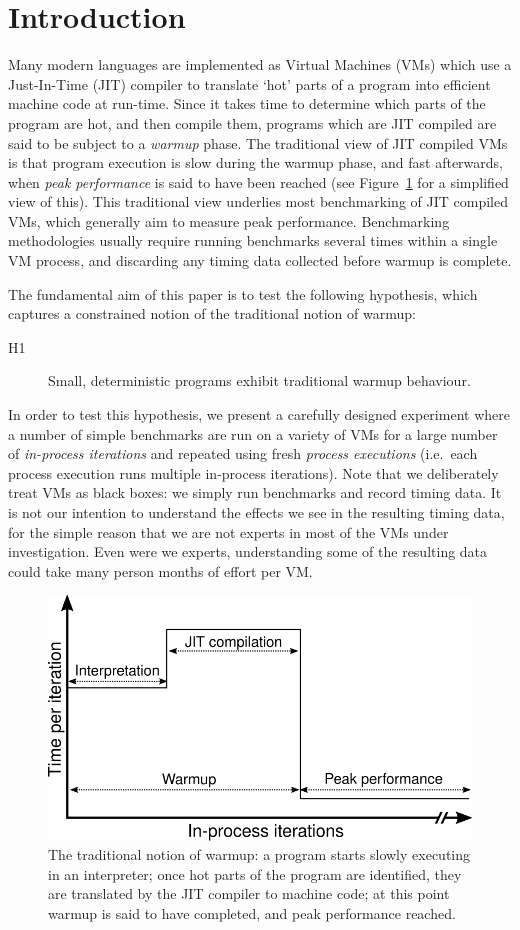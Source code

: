 \documentclass[a4paper,UKenglish]{lipics}
\newcommand{\hypone}{H1\xspace}
\begin{document}
\section{Introduction}
\label{sec:intro}

Many modern languages are implemented as Virtual Machines (VMs) which use a
Just-In-Time (JIT) compiler to translate `hot' parts of a program into efficient
machine code at run-time. Since it takes time to determine which parts of the
program are hot, and then compile them, programs which are JIT compiled are
said to be subject to a \emph{warmup} phase. The traditional view of
JIT compiled VMs is that program execution is slow during the warmup phase, and
fast afterwards, when \emph{peak performance} is said to have been reached
(see Figure~\ref{fig:trad} for a simplified view of this).
This traditional view underlies most benchmarking of JIT compiled VMs, which
generally aim to measure peak performance.
Benchmarking methodologies usually
require running benchmarks several times within a single VM process, and
discarding any timing data collected before warmup is complete.

The fundamental aim of this paper is to test the following hypothesis, which captures a constrained
notion of the traditional notion of warmup:
\begin{description}
  \item[\hypone] Small, deterministic programs exhibit traditional warmup behaviour.
\end{description}
In order to test this hypothesis, we present a carefully designed
experiment where a number of simple benchmarks are run on a variety of
VMs for a large number of \emph{in-process iterations} and repeated using fresh
\emph{process executions} (i.e.~each process execution runs multiple in-process
iterations). Note that we deliberately treat VMs as black
boxes: we simply run benchmarks and record timing data. It is not our intention
to understand the effects we see in the resulting timing data, for the simple
reason that we are not experts in most of the VMs under investigation. Even were
we experts, understanding some of the resulting data could take many person
months of effort per VM.

\begin{figure}[t]
\centering
\includegraphics[width=.5\textwidth]{img/picturebook_warmup}
\caption{The traditional notion of warmup: a program starts slowly executing in
an interpreter; once hot parts of the program are identified, they are
translated by the JIT compiler to machine code; at this point warmup
is said to have completed, and peak performance reached.}
\label{fig:trad}
\end{figure}
\end{document}
